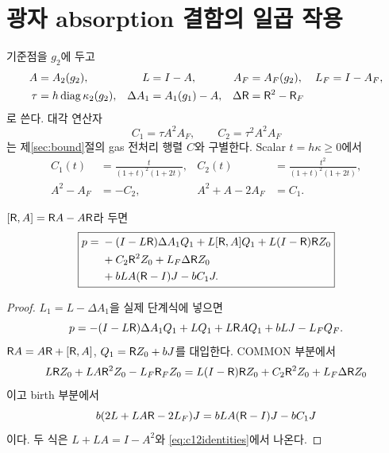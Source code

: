 \section{광자 absorption 결함의 일곱 작용}\label{sec:photon}
기준점을 $g_2$에 두고
\begin{align}
A&=A_2(g_2),&L&=I-A,&
A_F&=A_F(g_2),&L_F&=I-A_F,\\
\tau&=h\operatorname{diag}\kappa_2(g_2),&
\Delta A_1&=A_1(g_1)-A,&
\Delta\mathsf R&=\mathsf R^2-\mathsf R_F
\end{align}
로 쓴다. 대각 연산자
\begin{equation}
C_1=\tau A^2A_F,\qquad C_2=\tau^2A^2A_F
\label{eq:c12}
\end{equation}
는 제\ref{sec:bound}절의 gas 전처리 행렬 $C$와 구별한다. Scalar $t=h\kappa\ge0$에서
\begin{align}
C_1(t)&=\frac{t}{(1+t)^2(1+2t)},&
C_2(t)&=\frac{t^2}{(1+t)^2(1+2t)},\label{eq:c12scalar}\\
A^2-A_F&=-C_2,&A^2+A-2A_F&=C_1.
\label{eq:c12identities}
\end{align}

\begin{theorem}\label{thm:photon}
$[\mathsf R,A]=\mathsf R A-A\mathsf R$라 두면
\begin{equation}
\boxed{\begin{aligned}
p={}&-(I-L\mathsf R)\Delta A_1Q_1+L[\mathsf R,A]Q_1+L(I-\mathsf R)\mathsf R Z_0\\
&+C_2\mathsf R^2Z_0+L_F\Delta\mathsf R Z_0\\
&+bLA(\mathsf R-I)J-bC_1J.
\end{aligned}}
\label{eq:seven}
\end{equation}
\end{theorem}
\begin{proof}
$L_1=L-\Delta A_1$을 실제 단계식에 넣으면
\[
p=-(I-L\mathsf R)\Delta A_1Q_1+LQ_1+L\mathsf R A Q_1+bLJ-L_FQ_F.
\]
$\mathsf R A=A\mathsf R+[\mathsf R,A]$, $Q_1=\mathsf R Z_0+bJ$를 대입한다. COMMON 부분에서
\[
L\mathsf R Z_0+LA\mathsf R^2Z_0-L_F\mathsf R_F Z_0
=L(I-\mathsf R)\mathsf R Z_0+C_2\mathsf R^2Z_0+L_F\Delta\mathsf R Z_0
\]
이고 birth 부분에서
\[
b(2L+LA\mathsf R-2L_F)J=bLA(\mathsf R-I)J-bC_1J
\]
이다. 두 식은 $L+LA=I-A^2$와 \eqref{eq:c12identities}에서 나온다.
\end{proof}

